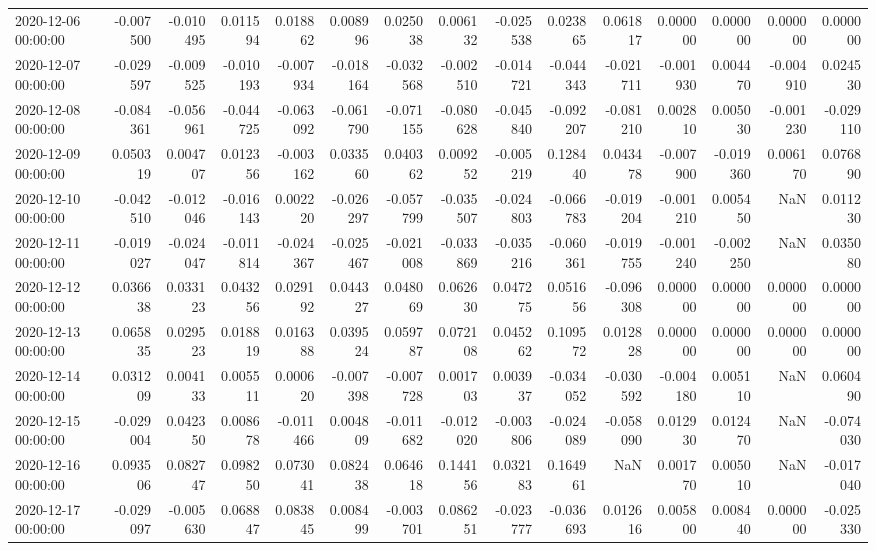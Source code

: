 \begin{tabular}{lrrrrrrrrrrrrrr}
2020-12-06 00:00:00 & -0.007500 & -0.010495 & 0.011594 & 0.018862 & 0.008996 & 0.025038 & 0.006132 & -0.025538 & 0.023865 & 0.061817 & 0.000000 & 0.000000 & 0.000000 & 0.000000 \\
2020-12-07 00:00:00 & -0.029597 & -0.009525 & -0.010193 & -0.007934 & -0.018164 & -0.032568 & -0.002510 & -0.014721 & -0.044343 & -0.021711 & -0.001930 & 0.004470 & -0.004910 & 0.024530 \\
2020-12-08 00:00:00 & -0.084361 & -0.056961 & -0.044725 & -0.063092 & -0.061790 & -0.071155 & -0.080628 & -0.045840 & -0.092207 & -0.081210 & 0.002810 & 0.005030 & -0.001230 & -0.029110 \\
2020-12-09 00:00:00 & 0.050319 & 0.004707 & 0.012356 & -0.003162 & 0.033560 & 0.040362 & 0.009252 & -0.005219 & 0.128440 & 0.043478 & -0.007900 & -0.019360 & 0.006170 & 0.076890 \\
2020-12-10 00:00:00 & -0.042510 & -0.012046 & -0.016143 & 0.002220 & -0.026297 & -0.057799 & -0.035507 & -0.024803 & -0.066783 & -0.019204 & -0.001210 & 0.005450 & NaN & 0.011230 \\
2020-12-11 00:00:00 & -0.019027 & -0.024047 & -0.011814 & -0.024367 & -0.025467 & -0.021008 & -0.033869 & -0.035216 & -0.060361 & -0.019755 & -0.001240 & -0.002250 & NaN & 0.035080 \\
2020-12-12 00:00:00 & 0.036638 & 0.033123 & 0.043256 & 0.029192 & 0.044327 & 0.048069 & 0.062630 & 0.047275 & 0.051656 & -0.096308 & 0.000000 & 0.000000 & 0.000000 & 0.000000 \\
2020-12-13 00:00:00 & 0.065835 & 0.029523 & 0.018819 & 0.016388 & 0.039524 & 0.059787 & 0.072108 & 0.045262 & 0.109572 & 0.012828 & 0.000000 & 0.000000 & 0.000000 & 0.000000 \\
2020-12-14 00:00:00 & 0.031209 & 0.004133 & 0.005511 & 0.000620 & -0.007398 & -0.007728 & 0.001703 & 0.003937 & -0.034052 & -0.030592 & -0.004180 & 0.005110 & NaN & 0.060490 \\
2020-12-15 00:00:00 & -0.029004 & 0.042350 & 0.008678 & -0.011466 & 0.004809 & -0.011682 & -0.012020 & -0.003806 & -0.024089 & -0.058090 & 0.012930 & 0.012470 & NaN & -0.074030 \\
2020-12-16 00:00:00 & 0.093506 & 0.082747 & 0.098250 & 0.073041 & 0.082438 & 0.064618 & 0.144156 & 0.032183 & 0.164961 & NaN & 0.001770 & 0.005010 & NaN & -0.017040 \\
2020-12-17 00:00:00 & -0.029097 & -0.005630 & 0.068847 & 0.083845 & 0.008499 & -0.003701 & 0.086251 & -0.023777 & -0.036693 & 0.012616 & 0.005800 & 0.008440 & 0.000000 & -0.025330 \\

\end{tabular}
